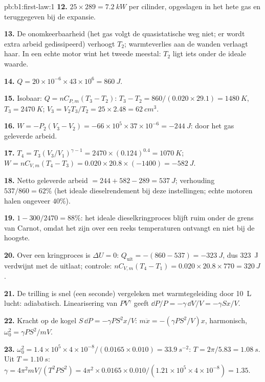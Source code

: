 \begin{solution}{pb:b1:first-law:1}
\textbf{12.} $25 \times 289 = \qty{7.2}{kW}$ per cilinder, opgeslagen in het hete
gas en teruggegeven bij de expansie.

\textbf{13.} De onomkeerbaarheid (het gas volgt de quasistatische weg niet;
er wordt extra arbeid gedissipeerd) verhoogt $T_2$; warmteverlies aan de wanden
verlaagt haar. In een echte motor wint het tweede meestal: $T_2$ ligt iets
onder de ideale waarde.

\textbf{14.} $Q = 20\times10^{-6} \times 43\times10^6 = \qty{860}{J}$.

\textbf{15.} Isobaar: $Q = nC_{P,m}(T_3 - T_2)$: $T_3 - T_2 = 860/(0.020 \times
29.1) = \qty{1480}{K}$, $T_3 = \qty{2470}{K}$; $V_3 = V_2T_3/T_2 = 25 \times
2.48 = \qty{62}{cm^3}$.

\textbf{16.} $W = -P_2(V_3 - V_2) = -66\times10^5 \times 37\times10^{-6} =
\qty{-244}{J}$: door het gas geleverde arbeid.

\textbf{17.} $T_4 = T_3(V_3/V_1)^{\gamma - 1} = 2470 \times (0.124)^{0.4} =
\qty{1070}{K}$; $W = nC_{V,m}(T_4 - T_3) = 0.020 \times 20.8 \times (-1400) =
\qty{-582}{J}$.

\textbf{18.} Netto geleverde arbeid $= 244 + 582 - 289 = \qty{537}{J}$; verhouding
$537/860 = 62\%$ (het ideale dieselrendement bij deze instellingen; echte
motoren halen ongeveer $40\%$).

\textbf{19.} $1 - 300/2470 = 88\%$: het ideale dieselkringproces blijft ruim
onder de grens van Carnot, omdat het zijn  over een reeks
temperaturen ontvangt en niet bij de hoogste.

\textbf{20.} Over een kringproces is $\Delta U = 0$: $Q_{\text{uit}} = -(860 - 537) =
\qty{-323}{J}$, dus \qty{323}{J} verdwijnt met de uitlaat; controle:
$nC_{V,m}(T_4 - T_1) = 0.020 \times 20.8 \times 770 = \qty{320}{J}$.

\textbf{21.} De trilling is snel (een seconde) vergeleken met warmtegeleiding
door \qty{10}{L} lucht: adiabatisch. Linearisering van
$PV^\gamma$ geeft $\dd P/P = -\gamma\,\dd V/V = -\gamma Sx/V$.

\textbf{22.} Kracht op de kogel $S\,\dd P = -\gamma PS^2x/V$: $m\ddot x =
-(\gamma PS^2/V)x$, harmonisch, $\omega_0^2 = \gamma PS^2/mV$.

\textbf{23.} $\omega_0^2 = 1.4 \times 10^5 \times 4\times10^{-8}/(0.0165 \times 0.010)
= \qty{33.9}{s^{-2}}$: $T = 2\pi/5.83 = \qty{1.08}{s}$. Uit $T = \qty{1.10}{s}$:
$\gamma = 4\pi^2mV/(T^2PS^2) = 4\pi^2 \times 0.0165 \times 0.010/(1.21 \times 10^5
\times 4\times10^{-8}) = 1.35$.


\end{solution}
